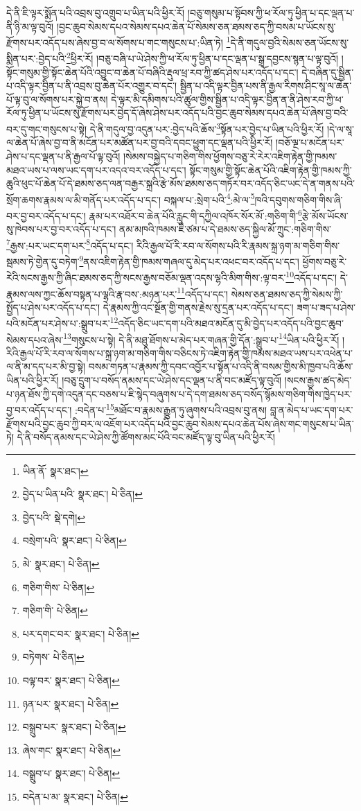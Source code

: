 དེ་ནི་ཇི་ལྟར་སྨོན་པའི་འབྲས་བུ་འགྲུབ་པ་ཡིན་པའི་ཕྱིར་རོ། །བཅུ་གསུམ་པ་སྟོབས་ཀྱི་ཕ་རོལ་ཏུ་ཕྱིན་པ་དང་ལྡན་པ་ནི་ཉི་མ་ལྟ་བུའོ། །བྱང་ཆུབ་སེམས་དཔའ་སེམས་དཔའ་ཆེན་པོ་སེམས་ཅན་ཐམས་ཅད་ཀྱི་བསམ་པ་ཡོངས་སུ་རྫོགས་པར་འདོད་པས་ཞེས་བྱ་བ་ལ་སོགས་པ་གང་གསུངས་པ་:ཡིན་ཏེ། \footnote{ཡིན་ནོ་  སྣར་ཐང་། }དེ་ནི་གདུལ་བྱའི་སེམས་ཅན་ཡོངས་སུ་སྨིན་པར་:བྱེད་པའི་\footnote{བྱེད་པ་ཡིན་པའི་  སྣར་ཐང་།  པེ་ཅིན། }ཕྱིར་རོ། །བཅུ་བཞི་པ་ཡེ་ཤེས་ཀྱི་ཕ་རོལ་ཏུ་ཕྱིན་པ་དང་ལྡན་པ་སྒྲ་དབྱངས་སྙན་པ་ལྟ་བུའོ། །སྟོང་གསུམ་གྱི་སྟོང་ཆེན་པོའི་འབྱུང་བ་ཆེན་པོ་བཞིའི་རྡུལ་ཕྲ་རབ་ཀྱི་ཚད་ཤེས་པར་འདོད་པ་དང་། དེ་བཞིན་དུ་སྦྱིན་པ་འདི་ལྟར་བྱིན་པ་ནི་འབྲས་བུ་ཆེན་པོར་འགྱུར་བ་དང་། སྦྱིན་པ་འདི་ལྟར་བྱིན་པས་ནི་རྒྱལ་རིགས་ཤིང་སཱ་ལ་ཆེན་པོ་ལྟ་བུ་ལ་སོགས་པར་སྐྱེ་བ་ནས། དེ་ལྟར་མི་དམིགས་པའི་ཚུལ་གྱིས་སྦྱིན་པ་འདི་ལྟར་བྱིན་ན་ནི་ཤེས་རབ་ཀྱི་ཕ་རོལ་ཏུ་ཕྱིན་པ་ཡོངས་སུ་རྫོགས་པར་བྱེད་དོ་ཞེས་ཤེས་པར་འདོད་པའི་བྱང་ཆུབ་སེམས་དཔའ་ཆེན་པོ་ཞེས་བྱ་བའི་བར་དུ་གང་གསུངས་པ་སྟེ། དེ་ནི་གདུལ་བྱ་འདུན་པར་:བྱེད་པའི་ཆོས་\footnote{བྱེད་པའི་  སྡེ་དགེ། }སྟོན་པར་བྱེད་པ་ཡིན་པའི་ཕྱིར་རོ། །དེ་ལ་སཱ་ལ་ཆེན་པོ་ཞེས་བྱ་བ་ནི་མངོན་པར་མཚོན་པར་བྱ་བའི་དབང་ཕྱུག་དང་ལྡན་པའི་ཕྱིར་རོ། །བཅོ་ལྔ་པ་མངོན་པར་ཤེས་པ་དང་ལྡན་པ་ནི་རྒྱལ་པོ་ལྟ་བུའོ། །སེམས་བསྐྱེད་པ་གཅིག་གིས་ཕྱོགས་བཅུ་རེ་རེར་འཇིག་རྟེན་གྱི་ཁམས་མཐའ་ཡས་པ་ལས་ཡང་དག་པར་འདའ་བར་འདོད་པ་དང་། སྟོང་གསུམ་གྱི་སྟོང་ཆེན་པོའི་འཇིག་རྟེན་གྱི་ཁམས་ཀྱི་ཆུའི་ཕུང་པོ་ཆེན་པོ་དེ་ཐམས་ཅད་ལན་བརྒྱར་སྐྲའི་རྩེ་མོས་ཐམས་ཅད་གཏོར་བར་འདོད་ཅིང་ཡང་དེ་ན་གནས་པའི་སྲོག་ཆགས་རྣམས་ལ་མི་གནོད་པར་འདོད་པ་དང་། བསྐལ་པ་:སྲེག་པའི་\footnote{བསྲེག་པའི་  སྣར་ཐང་།  པེ་ཅིན། }:མེ་ལ་\footnote{མེ་  སྣར་ཐང་།  པེ་ཅིན། }ཁའི་དབུགས་གཅིག་གིས་ཞི་བར་བྱ་བར་འདོད་པ་དང་། རྣམ་པར་འཐོར་བ་ཆེན་པོའི་རླུང་གི་དཀྱིལ་འཁོར་སོར་མོ་:གཅིག་གི་\footnote{གཅིག་གིས་  པེ་ཅིན། }རྩེ་མོས་ཡོངས་སུ་ཁེབས་པར་བྱ་བར་འདོད་པ་དང་། ནམ་མཁའི་ཁམས་ཇི་ཙམ་པ་དེ་ཐམས་ཅད་སྐྱིལ་མོ་ཀྲུང་:གཅིག་གིས་\footnote{གཅིག་གི་  པེ་ཅིན། }རྒྱས་:པར་ཡང་དག་པར་\footnote{པར་དགང་བར་  སྣར་ཐང་།  པེ་ཅིན། }འདོད་པ་དང་། རིའི་རྒྱལ་པོ་རི་རབ་ལ་སོགས་པའི་རི་རྣམས་སྐྲ་ཉག་མ་གཅིག་གིས་སྦམས་ཏེ་གྱེན་དུ་བཏེག་\footnote{བཏེགས་  པེ་ཅིན། }ནས་འཇིག་རྟེན་གྱི་ཁམས་གཞལ་དུ་མེད་པར་འཕང་བར་འདོད་པ་དང་། ཕྱོགས་བཅུ་རེ་རེའི་སངས་རྒྱས་ཀྱི་ཞིང་ཐམས་ཅད་ཀྱི་སངས་རྒྱས་བཅོམ་ལྡན་འདས་ལྷའི་མིག་གིས་:ལྟ་བར་\footnote{བལྟ་བར་  སྣར་ཐང་།  པེ་ཅིན། }འདོད་པ་དང་། དེ་རྣམས་ལས་ཀྱང་ཆོས་བསྟན་པ་ལྷའི་རྣ་བས་:མཉན་པར་\footnote{ཉན་པར་  སྣར་ཐང་།  པེ་ཅིན། }འདོད་པ་དང་། སེམས་ཅན་ཐམས་ཅད་ཀྱི་སེམས་ཀྱི་སྤྱོད་པ་ཤེས་པར་འདོད་པ་དང་། དེ་རྣམས་ཀྱི་འང་སྔོན་གྱི་གནས་རྗེས་སུ་དྲན་པར་འདོད་པ་དང་། ཟག་པ་ཟད་པ་ཤེས་པའི་མངོན་པར་ཤེས་པ་:སྒྲུབ་པར་\footnote{བསྒྲུབ་པར་  སྣར་ཐང་།  པེ་ཅིན། }འདོད་ཅིང་ཡང་དག་པའི་མཐའ་མངོན་དུ་མི་བྱེད་པར་འདོད་པའི་བྱང་ཆུབ་སེམས་དཔའ་ཞེས་\footnote{ཞེས་གང་  སྣར་ཐང་།  པེ་ཅིན། }གསུངས་པ་སྟེ། དེ་ནི་མཐུ་ཐོགས་པ་མེད་པར་གཞན་གྱི་དོན་:སྒྲུབ་པ་\footnote{བསྒྲུབ་པ་  སྣར་ཐང་།  པེ་ཅིན། }ཡིན་པའི་ཕྱིར་རོ། །རིའི་རྒྱལ་པོ་རི་རབ་ལ་སོགས་པ་སྐྲ་ཉག་མ་གཅིག་གིས་བཅིངས་ཏེ་འཇིག་རྟེན་གྱི་ཁམས་མཐའ་ཡས་པར་འཕེན་པ་ལ་ནི་མ་དད་པར་མི་བྱ་སྟེ། བསམ་གཏན་པ་རྣམས་ཀྱི་དབང་འབྱོར་པ་སྟོན་པ་འདི་ནི་བསམ་གྱིས་མི་ཁྱབ་པའི་ཆོས་ཡིན་པའི་ཕྱིར་རོ། །བཅུ་དྲུག་པ་བསོད་ནམས་དང་ཡེ་ཤེས་དང་ལྡན་པ་ནི་བང་མཛོད་ལྟ་བུའོ། །སངས་རྒྱས་ཚད་མེད་པ་ཉན་ཐོས་ཀྱི་དགེ་འདུན་དང་བཅས་པ་ཇི་སྙེད་བཞུགས་པ་དེ་དག་ཐམས་ཅད་བསོད་སྙོམས་གཅིག་གིས་ཁྱེད་པར་བྱ་བར་འདོད་པ་དང་། :བདེན་པ་\footnote{བདེན་པ་མ་  སྣར་ཐང་།  པེ་ཅིན། }མཐོང་བ་རྣམས་རྒྱུན་ཏུ་ཞུགས་པའི་འབྲས་བུ་ནས། བླ་ན་མེད་པ་ཡང་དག་པར་རྫོགས་པའི་བྱང་ཆུབ་ཀྱི་བར་ལ་འཇོག་པར་འདོད་པའི་བྱང་ཆུབ་སེམས་དཔའ་ཆེན་པོས་ཞེས་གང་གསུངས་པ་ཡིན་ཏེ། དེ་ནི་བསོད་ནམས་དང་ཡེ་ཤེས་ཀྱི་ཚོགས་མང་པོའི་བང་མཛོད་ལྟ་བུ་ཡིན་པའི་ཕྱིར་རོ། 
